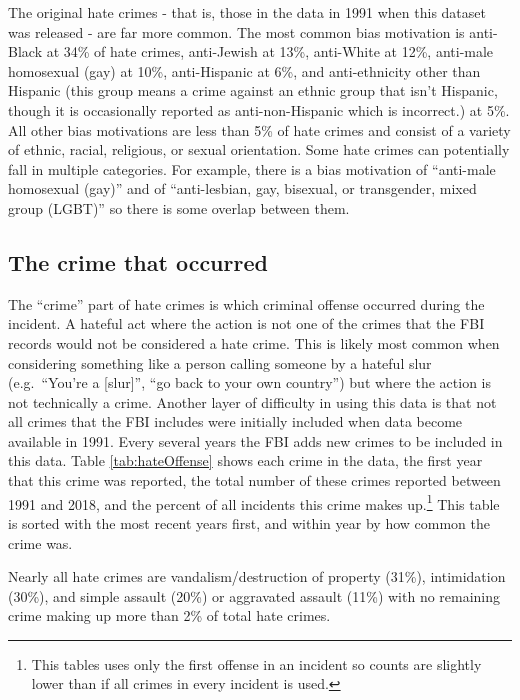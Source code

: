 \documentclass[
  12pt,
  openany]{book}
\begin{document}
The original hate crimes - that is, those in the data in 1991 when this dataset was released - are far more common. The most common bias motivation is anti-Black at 34\% of hate crimes, anti-Jewish at 13\%, anti-White at 12\%, anti-male homosexual (gay) at 10\%, anti-Hispanic at 6\%, and anti-ethnicity other than Hispanic (this group means a crime against an ethnic group that isn't Hispanic, though it is occasionally reported as anti-non-Hispanic which is incorrect.) at 5\%. All other bias motivations are less than 5\% of hate crimes and consist of a variety of ethnic, racial, religious, or sexual orientation. Some hate crimes can potentially fall in multiple categories. For example, there is a bias motivation of ``anti-male homosexual (gay)'' and of ``anti-lesbian, gay, bisexual, or transgender, mixed group (LGBT)'' so there is some overlap between them.

\hypertarget{the-crime-that-occurred}{%
\subsection{The crime that occurred}\label{the-crime-that-occurred}}

The ``crime'' part of hate crimes is which criminal offense occurred during the incident. A hateful act where the action is not one of the crimes that the FBI records would not be considered a hate crime. This is likely most common when considering something like a person calling someone by a hateful slur (e.g.~``You're a {[}slur{]}'', ``go back to your own country'') but where the action is not technically a crime. Another layer of difficulty in using this data is that not all crimes that the FBI includes were initially included when data become available in 1991. Every several years the FBI adds new crimes to be included in this data. Table \ref{tab:hateOffense} shows each crime in the data, the first year that this crime was reported, the total number of these crimes reported between 1991 and 2018, and the percent of all incidents this crime makes up.\footnote{This tables uses only the first offense in an incident so counts are slightly lower than if all crimes in every incident is used.} This table is sorted with the most recent years first, and within year by how common the crime was.

Nearly all hate crimes are vandalism/destruction of property (31\%), intimidation (30\%), and simple assault (20\%) or aggravated assault (11\%) with no remaining crime making up more than 2\% of total hate crimes.
\end{document}
